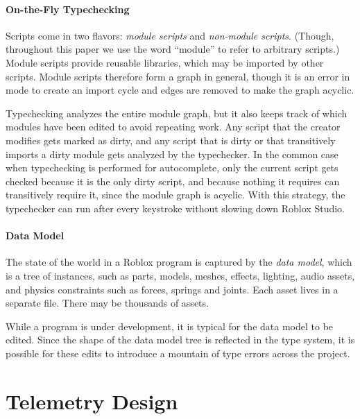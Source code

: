 \documentclass[english,submission,cleveref]{programming}
\begin{document}
\paragraph{On-the-Fly Typechecking}

Scripts come in two flavors: \emph{module scripts} and \emph{non-module
scripts}.
(Though, throughout this paper we use the word ``module''
to refer to arbitrary scripts.)
Module scripts provide reusable libraries, which may be
{imported} by other scripts.
Module scripts therefore form a graph in general,
though it is an error in \mstrict{} mode to create an import cycle
and edges are removed to make the graph acyclic.

Typechecking analyzes the entire module graph, but it also keeps track of which
modules have been edited to avoid repeating work.
Any script that the creator modifies gets marked as dirty,
and any script that is dirty or that transitively imports a dirty
module gets analyzed by the typechecker.
In the common case when typechecking is performed for autocomplete,
only the current script gets checked because it is the only dirty
script, and because nothing it requires can transitively require it, since
the module graph is acyclic.
With this strategy, the typechecker can run after every keystroke without
slowing down Roblox Studio.


\paragraph{Data Model}

The state of the world in a {Roblox} program is captured by
the \emph{data model}, which is a tree of {instances}, such as
parts, models, meshes, effects, lighting, audio assets, and physics
constraints such as forces, springs and joints.
Each asset lives in a separate file.
There may be thousands of assets.

While a program is under development, it is typical for the data
model to be edited.
Since the shape of the data model tree is reflected in
the type system, it is possible for these edits to introduce a mountain
of type errors across the project.


\section{Telemetry Design}
\end{document}
